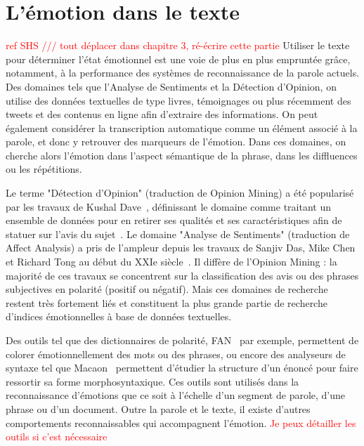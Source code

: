 \section{L'émotion dans le texte}
\textcolor{red}{ref SHS /// tout déplacer dans chapitre 3, ré-écrire cette partie}
Utiliser le texte pour déterminer l'état émotionnel est une voie de plus en plus empruntée grâce, notamment, à la performance des systèmes de reconnaissance de la parole actuels.
Des domaines tels que l'Analyse de Sentiments et la Détection d'Opinion, on utilise des données textuelles de type livres, témoignages ou plus récemment des tweets et  des contenus en ligne afin d'extraire des informations. On peut également considérer la transcription automatique comme un élément associé à la parole, et donc y retrouver des marqueurs de l'émotion.
Dans ces domaines, on cherche alors l'émotion dans l'aspect sémantique de la phrase, dans les diffluences ou les répétitions.

Le terme "Détection d'Opinion" (traduction de Opinion Mining) a été popularisé par les travaux de Kushal Dave~\cite{Dave2003}, définissant le domaine comme traitant un ensemble de données pour en retirer ses qualités et ses caractéristiques afin de statuer sur l'avis du sujet~\cite{Pang2008}. Le domaine "Analyse de Sentiments" (traduction de Affect Analysis) a pris de l'ampleur depuis les travaux de Sanjiv Das, Mike Chen et Richard Tong au début du XXIe siècle~\cite{Das2007,Tong2001}. Il diffère de l'Opinion Mining : la majorité de ces travaux se concentrent sur la classification des avis ou des phrases subjectives en polarité (positif ou négatif). Mais ces domaines de recherche restent très fortement liés et constituent la plus grande partie de recherche d'indices émotionnelles à base de données textuelles.

Des outils tel que des dictionnaires de polarité, FAN~\cite{Monnier2014} par exemple, permettent de colorer émotionnellement des mots ou des phrases, ou encore des analyseurs de syntaxe tel que Macaon~\cite{Nasr2011} permettent d'étudier la structure d'un énoncé pour faire ressortir sa forme morphosyntaxique. Ces outils sont utilisés dans la reconnaissance d'émotions que ce soit à l'échelle d'un segment de parole, d'une phrase ou d'un document. Outre la parole et le texte, il existe d'autres comportements reconnaissables qui accompagnent l'émotion.
\textcolor{red}{Je peux détailler les outils si c'est nécessaire}

